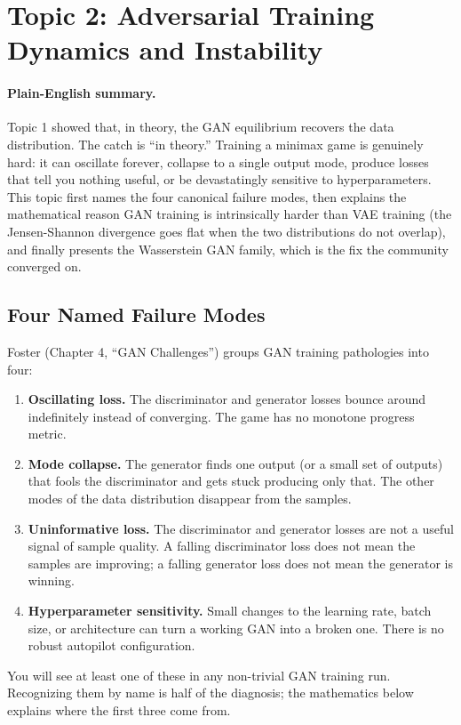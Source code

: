 \documentclass[11pt]{article}
\theoremstyle{remark}
\begin{document}
\section{Topic 2: Adversarial Training Dynamics and Instability}

\paragraph{Plain-English summary.}
Topic 1 showed that, in theory, the GAN equilibrium recovers the data distribution. The catch is ``in theory.'' Training a minimax game is genuinely hard: it can oscillate forever, collapse to a single output mode, produce losses that tell you nothing useful, or be devastatingly sensitive to hyperparameters. This topic first names the four canonical failure modes, then explains the mathematical reason GAN training is intrinsically harder than VAE training (the Jensen-Shannon divergence goes flat when the two distributions do not overlap), and finally presents the Wasserstein GAN family, which is the fix the community converged on.

\subsection{Four Named Failure Modes}

Foster (Chapter 4, ``GAN Challenges'') groups GAN training pathologies into four:
\begin{enumerate}
    \item \textbf{Oscillating loss.} The discriminator and generator losses bounce around indefinitely instead of converging. The game has no monotone progress metric.
    \item \textbf{Mode collapse.} The generator finds one output (or a small set of outputs) that fools the discriminator and gets stuck producing only that. The other modes of the data distribution disappear from the samples.
    \item \textbf{Uninformative loss.} The discriminator and generator losses are not a useful signal of sample quality. A falling discriminator loss does not mean the samples are improving; a falling generator loss does not mean the generator is winning.
    \item \textbf{Hyperparameter sensitivity.} Small changes to the learning rate, batch size, or architecture can turn a working GAN into a broken one. There is no robust autopilot configuration.
\end{enumerate}
You will see at least one of these in any non-trivial GAN training run. Recognizing them by name is half of the diagnosis; the mathematics below explains where the first three come from.
\end{document}
